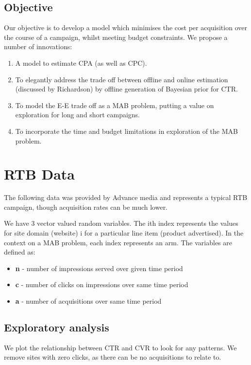 \documentclass[11pt,a4,singlespacing,titlepagenumber=on]{scrreprt}
\numberwithin{equation}{chapter} %
\theoremstyle{remark}
\begin{document}
\section{Objective}
Our objective is to develop a model which minimises the cost per acquisition over the course of a campaign, whilst meeting budget constraints. We propose a number of innovations:
\begin{enumerate}
	\item A model to estimate CPA (as well as CPC).
	\item To elegantly address the trade off between offline and online estimation (discussed by Richardson) by offline generation of Bayesian prior for CTR.
	\item To model the E-E trade off as a MAB problem, putting a value on exploration for long and short campaigns.
	\item To incorporate the time and budget limitations in exploration of the MAB problem.
\end{enumerate}


\chapter{RTB Data}

The following data was provided by Advance media and represents a typical RTB campaign, though acquisition rates can be much lower.

We have 3 vector valued random variables. The ith index represents the values for site domain (website) i for a particular line item (product advertised). In the context on a MAB problem, each index represents an arm. The variables are defined as:
\begin{itemize}
	\item \textbf{n} - number of impressions served over given time period
	\item \textbf{c} - number of clicks on impressions over same time period 
	\item \textbf{a} - number of acquisitions over same time period
\end{itemize}

\section{Exploratory analysis}

We plot the relationship between CTR and CVR to look for any patterns. We remove sites with zero clicks, as there can be no acquisitions to relate to. 
\end{document}
